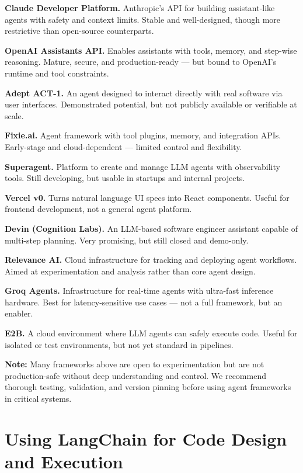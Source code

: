 \textbf{Claude Developer Platform.} Anthropic's API for building assistant-like agents with safety and context limits. Stable and well-designed, though more restrictive than open-source counterparts.

\textbf{OpenAI Assistants API.} Enables assistants with tools, memory, and step-wise reasoning. Mature, secure, and production-ready — but bound to OpenAI’s runtime and tool constraints.

\textbf{Adept ACT-1.} An agent designed to interact directly with real software via user interfaces. Demonstrated potential, but not publicly available or verifiable at scale.

\textbf{Fixie.ai.} Agent framework with tool plugins, memory, and integration APIs. Early-stage and cloud-dependent — limited control and flexibility.

\textbf{Superagent.} Platform to create and manage LLM agents with observability tools. Still developing, but usable in startups and internal projects.

\textbf{Vercel v0.} Turns natural language UI specs into React components. Useful for frontend development, not a general agent platform.

\textbf{Devin (Cognition Labs).} An LLM-based software engineer assistant capable of multi-step planning. Very promising, but still closed and demo-only.

\textbf{Relevance AI.} Cloud infrastructure for tracking and deploying agent workflows. Aimed at experimentation and analysis rather than core agent design.

\textbf{Groq Agents.} Infrastructure for real-time agents with ultra-fast inference hardware. Best for latency-sensitive use cases — not a full framework, but an enabler.

\textbf{E2B.} A cloud environment where LLM agents can safely execute code. Useful for isolated or test environments, but not yet standard in pipelines.

\bigskip
\noindent
\textbf{Note:} Many frameworks above are open to experimentation but are not production-safe without deep understanding and control. We recommend thorough testing, validation, and version pinning before using agent frameworks in critical systems.


%
\section{Using LangChain for Code Design and Execution}

